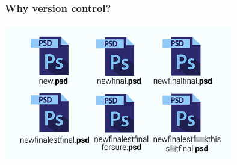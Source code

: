 \documentclass[aspectratio=169]{beamer}
\begin{document}

\begin{frame}
\frametitle{Why version control?}

\begin{center}
	\includegraphics[width=10cm]{graphics/psdversions.png}
\end{center}

\end{frame}

\end{document}
